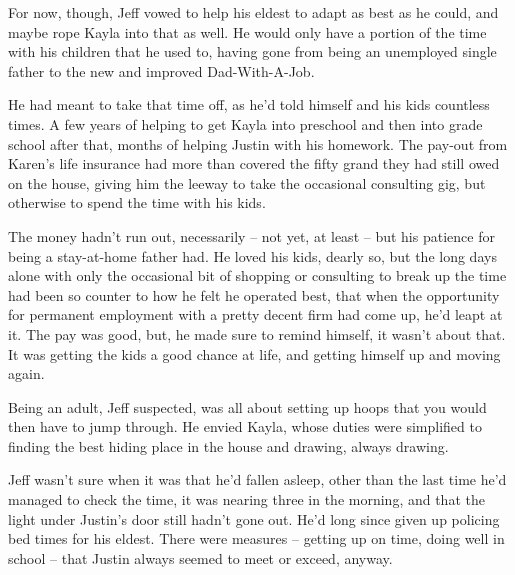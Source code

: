For now, though, Jeff vowed to help his eldest to adapt as best as he could, and maybe rope Kayla into that as well.  He would only have a portion of the time with his children that he used to, having gone from being an unemployed single father to the new and improved Dad-With-A-Job.

He had meant to take that time off, as he'd told himself and his kids countless times.  A few years of helping to get Kayla into preschool and then into grade school after that, months of helping Justin with his homework.  The pay-out from Karen's life insurance had more than covered the fifty grand they had still owed on the house, giving him the leeway to take the occasional consulting gig, but otherwise to spend the time with his kids.

The money hadn't run out, necessarily -- not yet, at least -- but his patience for being a stay-at-home father had.  He loved his kids, dearly so, but the long days alone with only the occasional bit of shopping or consulting to break up the time had been so counter to how he felt he operated best, that when the opportunity for permanent employment with a pretty decent firm had come up, he'd leapt at it.  The pay was good, but, he made sure to remind himself, it wasn't about that.  It was getting the kids a good chance at life, and getting himself up and moving again.

Being an adult, Jeff suspected, was all about setting up hoops that you would then have to jump through.  He envied Kayla, whose duties were simplified to finding the best hiding place in the house and drawing, always drawing.

\secdiv

Jeff wasn't sure when it was that he'd fallen asleep, other than the last time he'd managed to check the time, it was nearing three in the morning, and that the light under Justin's door still hadn't gone out.  He'd long since given up policing bed times for his eldest.  There were measures -- getting up on time, doing well in school -- that Justin always seemed to meet or exceed, anyway.
